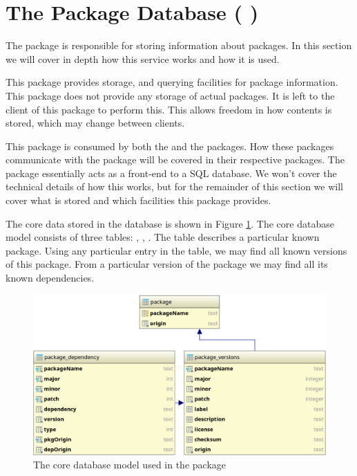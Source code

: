 \section{The Package Database ( \regdb)}
\label{sec:regdb}

The \regdb package is responsible for storing information about packages. In
this section we will cover in depth how this service works and how it is used.

This package provides storage, and querying facilities for package information.
This package does not provide any storage of actual packages. It is left to the
client of this package to perform this. This allows freedom in how contents is
stored, which may change between clients.

This package is consumed by both the \registry and the \cache packages. How
these packages communicate with the \regdb package will be covered in their
respective packages. The \regdb package essentially acts as a front-end to a
SQL database. We won't cover the technical details of how this works, but for
the remainder of this section we will cover what is stored and which facilities
this package provides.

The core data stored in the database is shown in Figure
\ref{fig:registry_database}. The core database model consists of three tables:
, , . The
 table describes a particular known package. Using any particular
entry in the  table, we may find all known versions of this
package. From a particular version of the package we may find all its known
dependencies.

\begin{figure}[H]
    \centering
    \includegraphics[width=1.0\textwidth]{pictures/regdb.png}
    \caption{The core database model used in the \regdb package}
    \label{fig:registry_database}
\end{figure}

